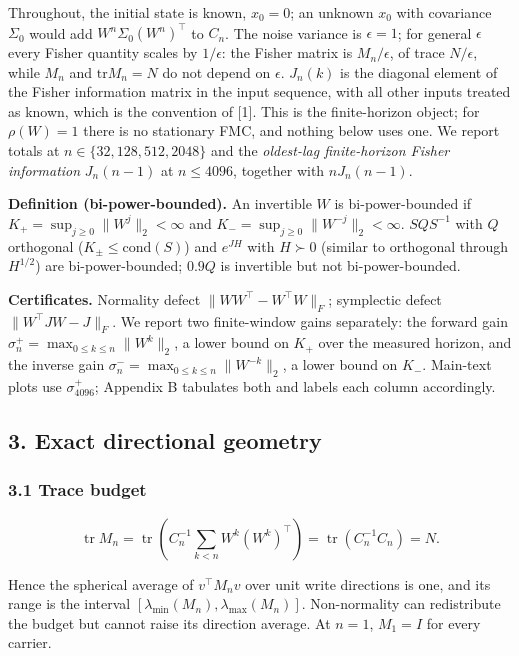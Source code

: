 \documentclass[
  10pt,
]{article}
\begin{document}
Throughout, the initial state is known, \(x_0=0\); an unknown \(x_0\)
with covariance \(\Sigma_0\) would add \(W^n\Sigma_0(W^n)^\top\) to
\(C_n\). The noise variance is \(\epsilon=1\); for general \(\epsilon\)
every Fisher quantity scales by \(1/\epsilon\): the Fisher matrix is
\(M_n/\epsilon\), of trace \(N/\epsilon\), while \(M_n\) and
\(\mathrm{tr}M_n=N\) do not depend on \(\epsilon\). \(J_n(k)\) is the
diagonal element of the Fisher information matrix in the input sequence,
with all other inputs treated as known, which is the convention of
{[}1{]}. This is the finite-horizon object; for \(\rho(W)=1\) there is
no stationary FMC, and nothing below uses one. We report totals at
\(n\in\{32,128,512,2048\}\) and the \emph{oldest-lag finite-horizon
Fisher information} \(J_n(n-1)\) at \(n\le4096\), together with
\(nJ_n(n-1)\).

\textbf{Definition (bi-power-bounded).} An invertible \(W\) is
bi-power-bounded if \(K_+=\sup_{j\ge0}\|W^j\|_2<\infty\) and
\(K_-=\sup_{j\ge0}\|W^{-j}\|_2<\infty\). \(SQS^{-1}\) with \(Q\)
orthogonal (\(K_\pm\le\mathrm{cond}(S)\)) and \(e^{JH}\) with
\(H\succ0\) (similar to orthogonal through \(H^{1/2}\)) are
bi-power-bounded; \(0.9Q\) is invertible but not bi-power-bounded.

\textbf{Certificates.} Normality defect \(\|WW^\top-W^\top W\|_F\);
symplectic defect \(\|W^\top JW-J\|_F\). We report two finite-window
gains separately: the forward gain
\(\sigma^{+}_{n}=\max_{0\le k\le n}\|W^{k}\|_2\), a lower bound on
\(K_+\) over the measured horizon, and the inverse gain
\(\sigma^{-}_{n}=\max_{0\le k\le n}\|W^{-k}\|_2\), a lower bound on
\(K_-\). Main-text plots use \(\sigma^{+}_{4096}\); Appendix B tabulates
both and labels each column accordingly.

\subsection{3. Exact directional
geometry}\label{exact-directional-geometry}

\subsubsection{3.1 Trace budget}\label{trace-budget}

\[
\operatorname{tr}M_n
=\operatorname{tr}\!\left(C_n^{-1}\sum_{k<n}W^k(W^k)^\top\right)
=\operatorname{tr}(C_n^{-1}C_n)=N .
\]

Hence the spherical average of \(v^\top M_nv\) over unit write
directions is one, and its range is the interval
\([\lambda_{\min}(M_n),\lambda_{\max}(M_n)]\). Non-normality can
redistribute the budget but cannot raise its direction average. At
\(n=1\), \(M_1=I\) for every carrier.
\end{document}
